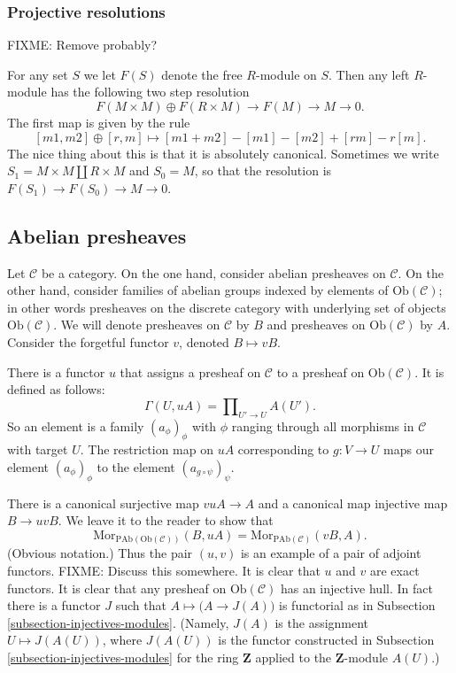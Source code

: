 \subsubsection{Projective resolutions}
\label{subsubsection-projective-resolution}

\noindent
FIXME: Remove probably?

\noindent
For any set $S$ we let $F(S)$ denote the free $R$-module on $S$.
Then any left $R$-module has the following two step resolution
$$
F(M\times M) \oplus F(R\times M) \to F(M) \to M \to 0.
$$
The first map is given by the rule
$$
[m1,m2] \oplus [r,m] \mapsto [m1+m2]-[m1]-[m2]+[rm]-r[m].
$$
The nice thing about this is that it is absolutely canonical.
Sometimes we write $S_1 = M\times M \coprod R\times M$ and
$S_0=M$, so that the resolution is $F(S_1) \to F(S_0) \to M \to 0$.

\subsection{Abelian presheaves}
\label{subsection-injectives-presheaves}

\noindent
Let $\mathcal{C}$ be a category. On the one hand, consider abelian
presheaves on $\mathcal{C}$. On the other hand, consider
families of abelian groups indexed by elements of
$\text{Ob}(\mathcal{C})$; in other words presheaves on the discrete
category with underlying set of objects $\text{Ob}(\mathcal{C})$.
We will denote presheaves on $\mathcal{C}$ by $B$ and presheaves on
$\text{Ob}(\mathcal{C})$ by $A$. Consider the forgetful functor $v$,
denoted $B \mapsto vB$.

\smallskip\noindent
There is a functor $u$ that assigns a presheaf on $\mathcal{C}$
to a presheaf on $\text{Ob}(\mathcal{C})$. It is defined as follows:
$$
\Gamma(U, uA) = \prod\nolimits_{U' \to U} A(U').
$$
So an element is a family $(a_\phi)_\phi$ with $\phi$
ranging through all morphisms in $\mathcal{C}$ with target $U$.
The restriction map on $uA$ corresponding to $g : V \to U$
maps our element $(a_\phi)_\phi$ to the element 
$(a_{g \circ \psi})_\psi$. 

\smallskip\noindent
There is a canonical surjective map $vuA \to A$ and a canonical map
injective map $B \to uvB$. We leave it to the reader to show that
$$
\text{Mor}_{\text{PAb}(\text{Ob}(\mathcal{C}))}(B, uA) =
\text{Mor}_{\text{PAb}(\mathcal{C})}(vB, A).
$$
(Obvious notation.) Thus the pair $(u,v)$ is an example of a pair of adjoint
functors. FIXME: Discuss this somewhere. It is clear that $u$ and $v$ are exact functors. It is clear that any presheaf on $\text{Ob}(\mathcal{C})$ has an
injective hull. In fact there is a functor $J$ such that
$A \mapsto \big(A \to J(A)\big)$ is functorial as in
Subsection \ref{subsection-injectives-modules}.
(Namely, $J(A)$ is the assignment $U\mapsto J(A(U))$, where
$J(A(U))$ is the functor constructed in
Subsection \ref{subsection-injectives-modules} for the ring $\mathbf{Z}$
applied to the $\mathbf{Z}$-module $A(U)$.)

